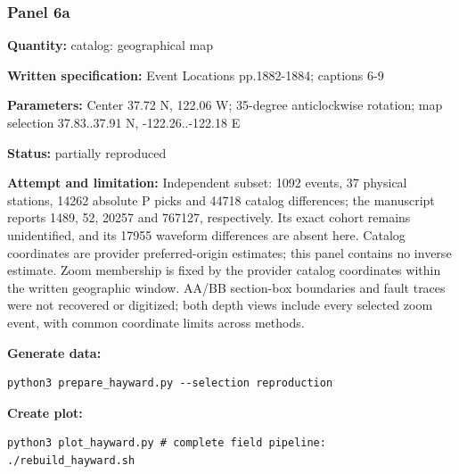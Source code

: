 \subsubsection*{Panel 6a}
\noindent\textbf{Quantity:} catalog: geographical map\par
\noindent\textbf{Written specification:} Event Locations pp.1882-1884; captions 6-9\par
\noindent\textbf{Parameters:} Center 37.72 N, 122.06 W; 35-degree anticlockwise rotation; map selection 37.83..37.91 N, -122.26..-122.18 E\par
\noindent\textbf{Status:} partially reproduced\par
\noindent\textbf{Attempt and limitation:} Independent subset: 1092 events, 37 physical stations, 14262 absolute P picks and 44718 catalog differences; the manuscript reports 1489, 52, 20257 and 767127, respectively. Its exact cohort remains unidentified, and its 17955 waveform differences are absent here. Catalog coordinates are provider preferred-origin estimates; this panel contains no inverse estimate. Zoom membership is fixed by the provider catalog coordinates within the written geographic window. AA/BB section-box boundaries and fault traces were not recovered or digitized; both depth views include every selected zoom event, with common coordinate limits across methods.\par
\noindent\textbf{Generate data:}
\begin{lstlisting}
python3 prepare_hayward.py --selection reproduction
\end{lstlisting}
\noindent\textbf{Create plot:}
\begin{lstlisting}
python3 plot_hayward.py # complete field pipeline: ./rebuild_hayward.sh
\end{lstlisting}

